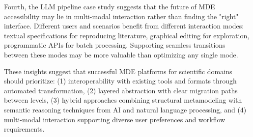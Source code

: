 Fourth, the LLM pipeline case study suggests that the future of MDE accessibility may lie in multi-modal interaction rather than finding the "right" interface. Different users and scenarios benefit from different interaction modes: textual specifications for reproducing literature, graphical editing for exploration, programmatic APIs for batch processing. Supporting seamless transitions between these modes may be more valuable than optimizing any single mode.

These insights suggest that successful MDE platforms for scientific domains should prioritize: (1) interoperability with existing tools and formats through automated transformation, (2) layered abstraction with clear migration paths between levels, (3) hybrid approaches combining structural metamodeling with semantic reasoning techniques from AI and natural language processing, and (4) multi-modal interaction supporting diverse user preferences and workflow requirements.